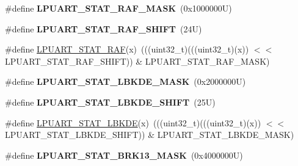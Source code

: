 \begin{DoxyCompactItemize}
\mbox{\label{group___l_p_u_a_r_t___register___masks_gae270407ae3170ab35c03dde777ba89c7}} 
\#define {\bfseries L\+P\+U\+A\+R\+T\+\_\+\+S\+T\+A\+T\+\_\+\+R\+A\+F\+\_\+\+M\+A\+SK}~(0x1000000\+U)
\item 
\mbox{\label{group___l_p_u_a_r_t___register___masks_ga714be6f396719fc672c346113227657e}} 
\#define {\bfseries L\+P\+U\+A\+R\+T\+\_\+\+S\+T\+A\+T\+\_\+\+R\+A\+F\+\_\+\+S\+H\+I\+FT}~(24\+U)
\item 
\#define \mbox{\hyperlink{group___l_p_u_a_r_t___register___masks_ga1a40ceea5c411de9bbc9cf3de53bce2e}{L\+P\+U\+A\+R\+T\+\_\+\+S\+T\+A\+T\+\_\+\+R\+AF}}(x)~(((uint32\+\_\+t)(((uint32\+\_\+t)(x)) $<$$<$ L\+P\+U\+A\+R\+T\+\_\+\+S\+T\+A\+T\+\_\+\+R\+A\+F\+\_\+\+S\+H\+I\+FT)) \& L\+P\+U\+A\+R\+T\+\_\+\+S\+T\+A\+T\+\_\+\+R\+A\+F\+\_\+\+M\+A\+SK)
\item 
\mbox{\label{group___l_p_u_a_r_t___register___masks_ga5e042db2601f7805fd05c0ef9ebf7207}} 
\#define {\bfseries L\+P\+U\+A\+R\+T\+\_\+\+S\+T\+A\+T\+\_\+\+L\+B\+K\+D\+E\+\_\+\+M\+A\+SK}~(0x2000000\+U)
\item 
\mbox{\label{group___l_p_u_a_r_t___register___masks_ga5a9e8706b29e508202745f982c01cb94}} 
\#define {\bfseries L\+P\+U\+A\+R\+T\+\_\+\+S\+T\+A\+T\+\_\+\+L\+B\+K\+D\+E\+\_\+\+S\+H\+I\+FT}~(25\+U)
\item 
\#define \mbox{\hyperlink{group___l_p_u_a_r_t___register___masks_gae1cd752f915d24c79e7868f1c59c6f7b}{L\+P\+U\+A\+R\+T\+\_\+\+S\+T\+A\+T\+\_\+\+L\+B\+K\+DE}}(x)~(((uint32\+\_\+t)(((uint32\+\_\+t)(x)) $<$$<$ L\+P\+U\+A\+R\+T\+\_\+\+S\+T\+A\+T\+\_\+\+L\+B\+K\+D\+E\+\_\+\+S\+H\+I\+FT)) \& L\+P\+U\+A\+R\+T\+\_\+\+S\+T\+A\+T\+\_\+\+L\+B\+K\+D\+E\+\_\+\+M\+A\+SK)
\item 
\mbox{\label{group___l_p_u_a_r_t___register___masks_gaa7c43c685dd95e006228e2709d87012d}} 
\#define {\bfseries L\+P\+U\+A\+R\+T\+\_\+\+S\+T\+A\+T\+\_\+\+B\+R\+K13\+\_\+\+M\+A\+SK}~(0x4000000\+U)
\item 
\mbox{\label{group___l_p_u_a_r_t___register___masks_ga30a4cc6ce8a95462963ec317c2310199}} 

\end{DoxyCompactItemize}
